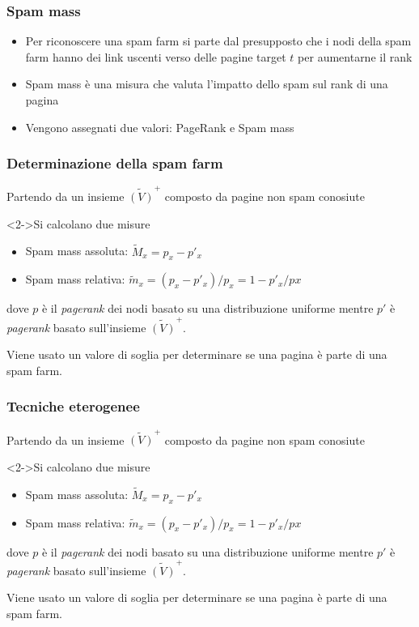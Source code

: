 \documentclass{beamer}
\begin{document}
\begin{frame}
  \frametitle{Spam mass}
  \begin{itemize}
   \item Per riconoscere una spam farm si parte dal presupposto che i nodi della spam farm hanno dei link uscenti verso delle pagine target \(t\) per aumentarne il rank
   \item Spam mass è una misura che valuta l'impatto dello spam sul rank di una pagina
   \item Vengono assegnati due valori: PageRank e Spam mass
  \end{itemize}
\end{frame}
\begin{frame}
  \frametitle{Determinazione della spam farm}
  Partendo da un insieme \(\tilde{(V)}^+\) composto da pagine non spam conosiute
   \begin{block}<2->{Si calcolano due misure}
   \begin{itemize}
    \item Spam mass assoluta: \(\tilde{M}_x=p_x-p'_x\)
     \item Spam mass relativa:  \(\tilde{m}_x=(p_x-p'_x)/p_x=1-p'_x/px\)
   \end{itemize}
   dove \(p\) è il \textit{pagerank} dei nodi basato su una distribuzione uniforme mentre \(p'\) è \textit{pagerank} basato sull'insieme \(\tilde{(V)}^+\).
   
   Viene usato un valore di soglia per determinare se una pagina è parte di una spam farm.
   \end{block}
\end{frame}
\begin{frame}
  \frametitle{Tecniche eterogenee}
  Partendo da un insieme \(\tilde{(V)}^+\) composto da pagine non spam conosiute
   \begin{block}<2->{Si calcolano due misure}
   \begin{itemize}
    \item Spam mass assoluta: \(\tilde{M}_x=p_x-p'_x\)
     \item Spam mass relativa:  \(\tilde{m}_x=(p_x-p'_x)/p_x=1-p'_x/px\)
   \end{itemize}
   dove \(p\) è il \textit{pagerank} dei nodi basato su una distribuzione uniforme mentre \(p'\) è \textit{pagerank} basato sull'insieme \(\tilde{(V)}^+\).
   
   Viene usato un valore di soglia per determinare se una pagina è parte di una spam farm.
   \end{block}
\end{frame}
\end{document}
